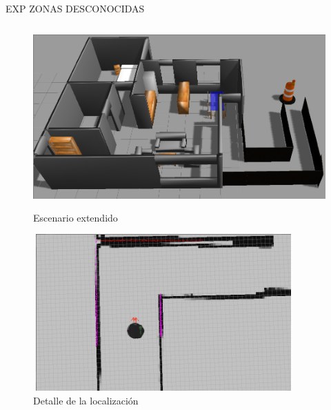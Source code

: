 EXP ZONAS DESCONOCIDAS


\begin{figure}[hbtp]
  \begin{center}
    \includegraphics[width=12cm,height=7cm]{img/cap7/grannieAnne-ext}
  \end{center}
  \caption{Escenario extendido}
  \label{fig:grannieAnne-ext}
\end{figure}

\begin{figure}[hbtp]
  \begin{center}
    \includegraphics[width=10cm,height=6cm]{img/cap7/localization-ext}
  \end{center}
  \caption{Detalle de la localización}
  \label{fig:localization-ext}
\end{figure}


